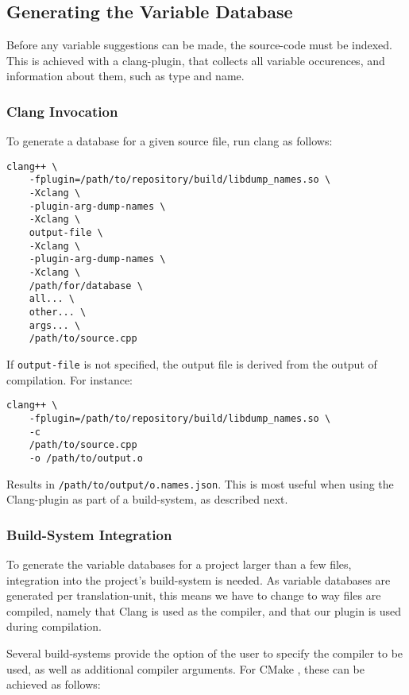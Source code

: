 \subsection{Generating the Variable Database}
Before any variable suggestions can be made, the source-code must be indexed.
This is achieved with a clang-plugin, that collects all variable occurences,
and information about them, such as type and name.

\subsubsection{Clang Invocation}
To generate a database for a given source file, run clang as follows:

\begin{lstlisting}[caption={Invocation of Clang}]
clang++ \
	-fplugin=/path/to/repository/build/libdump_names.so \
	-Xclang \
	-plugin-arg-dump-names \
	-Xclang \
	output-file \
	-Xclang \
	-plugin-arg-dump-names \
	-Xclang \
	/path/for/database \
	all... \
	other... \
	args... \
	/path/to/source.cpp
\end{lstlisting}

If \lstinline|output-file| is not specified, the output file is derived from the
output of compilation. For instance:

\begin{lstlisting}[caption={Invocation of Clang with Defaulted Output Filename}]
clang++ \
	-fplugin=/path/to/repository/build/libdump_names.so \
	-c
	/path/to/source.cpp
	-o /path/to/output.o
\end{lstlisting}

Results in \lstinline|/path/to/output/o.names.json|. This is most useful when
using the Clang-plugin as part of a build-system, as described next.

\subsubsection{Build-System Integration}
To generate the variable databases for a project larger than a few files,
integration into the project's build-system is needed. As variable databases are
generated per translation-unit, this means we have to change to way \CC{} files
are compiled, namely that Clang is used as the compiler, and that our plugin is
used during compilation.

Several build-systems provide the option of the user to specify the compiler to
be used, as well as additional compiler arguments. For CMake \cite{cmake}, these
can be achieved as follows:


